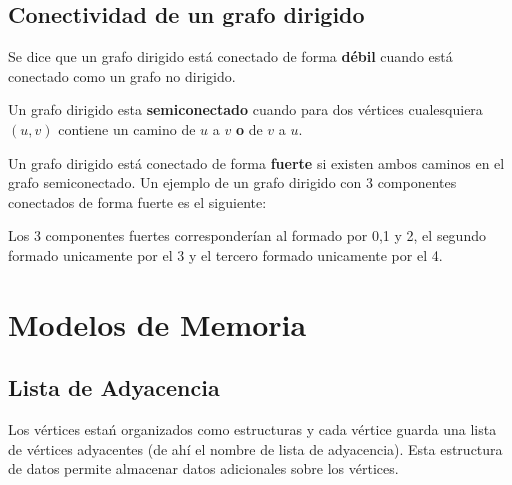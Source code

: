 \documentclass[11pt]{article}
\theoremstyle{plain}
\begin{document}

        \subsection{Conectividad de un grafo dirigido} %
        \label{sub:conectividad_de_un_grafo_dirigido}
            Se dice que un grafo dirigido está conectado de forma \textbf{débil} cuando está conectado como un grafo no dirigido.

            Un grafo dirigido esta \textbf{semiconectado} cuando para dos vértices cualesquiera $(u,v)$ contiene un camino de $u$ a $v$ \textbf{o} de $v$ a $u$.

            Un grafo dirigido está conectado de forma \textbf{fuerte} si existen ambos caminos en el grafo semiconectado. Un ejemplo de un grafo dirigido con 3 componentes conectados de forma fuerte es el siguiente:\\
            \begin{center}
            \end{center}
            Los 3 componentes fuertes corresponderían al formado por 0,1 y 2, el segundo formado unicamente por el 3 y el tercero formado unicamente por el 4.
    \section{Modelos de Memoria} %
    \label{sec:modelos_de_memoria}
        \subsection{Lista de Adyacencia} %
        \label{sub:lista_de_adyacencia}
            Los vértices estań organizados como estructuras y cada vértice guarda una lista de vértices adyacentes (de ahí el nombre de lista de adyacencia). Esta estructura de datos permite almacenar datos adicionales sobre los vértices.
\end{document}
